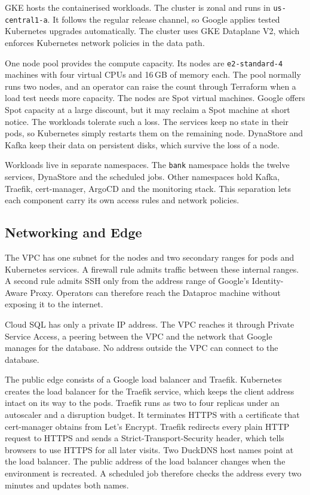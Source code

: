 \documentclass[11pt,a4paper]{article}
\newcommand{\code}[1]{\texttt{#1}}
\begin{document}
GKE hosts the containerised workloads. The cluster is zonal and runs in \code{us-central1-a}. It follows the regular release channel, so Google applies tested Kubernetes upgrades automatically. The cluster uses GKE Dataplane V2, which enforces Kubernetes network policies in the data path.

One node pool provides the compute capacity. Its nodes are \code{e2-standard-4} machines with four virtual CPUs and 16\,GB of memory each. The pool normally runs two nodes, and an operator can raise the count through Terraform when a load test needs more capacity. The nodes are Spot virtual machines. Google offers Spot capacity at a large discount, but it may reclaim a Spot machine at short notice. The workloads tolerate such a loss. The services keep no state in their pods, so Kubernetes simply restarts them on the remaining node. DynaStore and Kafka keep their data on persistent disks, which survive the loss of a node.

Workloads live in separate namespaces. The \code{bank} namespace holds the twelve services, DynaStore and the scheduled jobs. Other namespaces hold Kafka, Traefik, cert-manager, ArgoCD and the monitoring stack. This separation lets each component carry its own access rules and network policies.

\subsection{Networking and Edge}
\label{sec:network}

The VPC has one subnet for the nodes and two secondary ranges for pods and Kubernetes services. A firewall rule admits traffic between these internal ranges. A second rule admits SSH only from the address range of Google's Identity-Aware Proxy. Operators can therefore reach the Dataproc machine without exposing it to the internet.

Cloud SQL has only a private IP address. The VPC reaches it through Private Service Access, a peering between the VPC and the network that Google manages for the database. No address outside the VPC can connect to the database.

The public edge consists of a Google load balancer and Traefik. Kubernetes creates the load balancer for the Traefik service, which keeps the client address intact on its way to the pods. Traefik runs as two to four replicas under an autoscaler and a disruption budget. It terminates HTTPS with a certificate that cert-manager obtains from Let's Encrypt. Traefik redirects every plain HTTP request to HTTPS and sends a Strict-Transport-Security header, which tells browsers to use HTTPS for all later visits. Two DuckDNS host names point at the load balancer. The public address of the load balancer changes when the environment is recreated. A scheduled job therefore checks the address every two minutes and updates both names.
\end{document}
